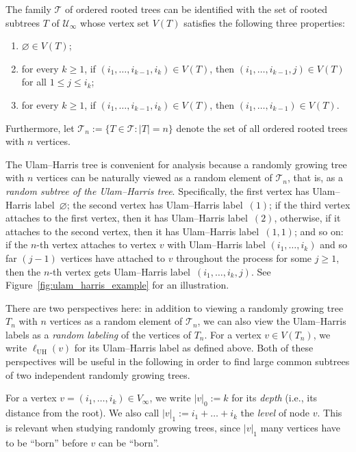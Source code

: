 \documentclass[11pt]{article}
\makeatletter
\numberwithin{equation}{section}
\newcommand{\UH}{\mathrm{UH}} %
\def\namedlabel#1#2{\begingroup
	#2%
	\def\@currentlabel{#2}%
	\phantomsection\label{#1}\endgroup
}
\def\cT{{\mathcal T}}
\def\cU{{\mathcal U}}
\theoremstyle{definition}
\makeatother
\begin{document}
The family $\cT$ of ordered rooted trees can be identified with the set of rooted subtrees $T$ of $\cU_{\infty}$ whose vertex set $V(T)$ satisfies the following three properties: 
\begin{enumerate}
\item[\namedlabel{prop:UH1}{(UH1)}] $\varnothing \in V(T)$;
\item[\namedlabel{prop:UH2}{(UH2)}] for every $k \geq 1$, if $(i_{1}, \ldots ,i_{k-1}, i_{k}) \in V(T)$, then $(i_{1}, \ldots, i_{k-1}, j) \in V(T)$ for all $1 \leq j \leq i_{k}$;
\item[\namedlabel{prop:UH3}{(UH3)}] for every $k \geq 1$, if $(i_{1}, \ldots, i_{k-1}, i_{k}) \in V(T)$, then $(i_{1}, \ldots, i_{k-1}) \in V(T)$.
\end{enumerate} 
Furthermore, let $\cT_{n} := \{ T \in \cT : |T| = n \}$ denote the set of all ordered rooted trees with $n$ vertices. 


The Ulam--Harris tree is convenient for analysis because a randomly growing tree with $n$ vertices can be naturally viewed as a random element of $\cT_{n}$, that is, as a \emph{random subtree of the Ulam--Harris tree}. 
Specifically, 
the first vertex has Ulam--Harris label~$\varnothing$; 
the second vertex has Ulam--Harris label~$(1)$; 
if the third vertex attaches to the first vertex, then it has Ulam--Harris label~$(2)$, 
otherwise, if it attaches to the second vertex, then it has Ulam--Harris label~$(1,1)$; 
and so on: 
if the $n$-th vertex attaches to vertex $v$ with Ulam--Harris label $(i_{1},\ldots, i_{k})$  
and so far $(j-1)$ vertices have attached to $v$ throughout the process for some $j\geq 1$, 
then the $n$-th vertex gets Ulam--Harris label~$(i_{1} ,\ldots, i_{k}, j)$. 
See Figure~\ref{fig:ulam_harris_example} for an illustration. 


There are two perspectives here: 
in addition to viewing a randomly growing tree $T_{n}$ with $n$ vertices as a random element of $\cT_{n}$, 
we can also view the Ulam--Harris labels as a \emph{random labeling} of the vertices of $T_{n}$. 
For a vertex $v \in V(T_{n})$, we write $\ell_{\UH}(v)$ for its Ulam--Harris label as defined above. 
Both of these perspectives will be useful in the following in order to find large common subtrees of two independent randomly growing trees. 


For a vertex $v = (i_{1}, \ldots, i_{k}) \in V_{\infty}$, 
we write $|v|_{0} := k$ for its \emph{depth} (i.e., its distance from the root). 
We also call $|v|_{1} := i_{1} + \ldots + i_{k}$ the \emph{level} of node $v$. 
This is relevant when studying randomly growing trees, since $|v|_{1}$ many vertices have to be ``born'' before $v$ can be ``born''. 
\end{document}
